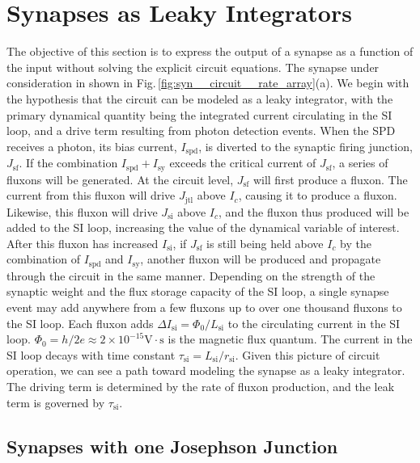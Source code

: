 \documentclass[twocolumn]{article}
\begin{document}
\section{\label{sec:synapses}Synapses as Leaky Integrators}
The objective of this section is to express the output of a synapse as a function of the input without solving the explicit circuit equations. The synapse under consideration in shown in Fig.\,\ref{fig:syn__circuit__rate_array}(a). We begin with the hypothesis that the circuit can be modeled as a leaky integrator, with the primary dynamical quantity being the integrated current circulating in the SI loop, and a drive term resulting from photon detection events. When the SPD receives a photon, its bias current, $I_{\mathrm{spd}}$, is diverted to the synaptic firing junction, $J_{\mathrm{sf}}$. If the combination $I_{\mathrm{spd}}+I_{\mathrm{sy}}$ exceeds the critical current of $J_{\mathrm{sf}}$, a series of fluxons will be generated. At the circuit level, $J_{\mathrm{sf}}$ will first produce a fluxon. The current from this fluxon will drive $J_{\mathrm{jtl}}$ above $I_c$, causing it to produce a fluxon. Likewise, this fluxon will drive $J_{\mathrm{si}}$ above $I_c$, and the fluxon thus produced will be added to the SI loop, increasing the value of the dynamical variable of interest. After this fluxon has increased $I_{\mathrm{si}}$, if $J_{\mathrm{sf}}$ is still being held above $I_c$ by the combination of $I_{\mathrm{spd}}$ and $I_{\mathrm{sy}}$, another fluxon will be produced and propagate through the circuit in the same manner. Depending on the strength of the synaptic weight and the flux storage capacity of the SI loop, a single synapse event may add anywhere from a few fluxons up to over one thousand fluxons to the SI loop. Each fluxon adds $\Delta I_{\mathrm{si}} = \Phi_0/L_{\mathrm{si}}$ to the circulating current in the SI loop. $\Phi_0 = h/2e \approx 2\times10^{-15}\mathrm{V}\cdot\mathrm{s}$ is the magnetic flux quantum. The current in the SI loop decays with time constant $\tau_{\mathrm{si}} = L_{\mathrm{si}}/r_{\mathrm{si}}$. Given this picture of circuit operation, we can see a path toward modeling the synapse as a leaky integrator. The driving term is determined by the rate of fluxon production, and the leak term is governed by $\tau_{\mathrm{si}}$.

\subsection{Synapses with one Josephson Junction}
\end{document}
